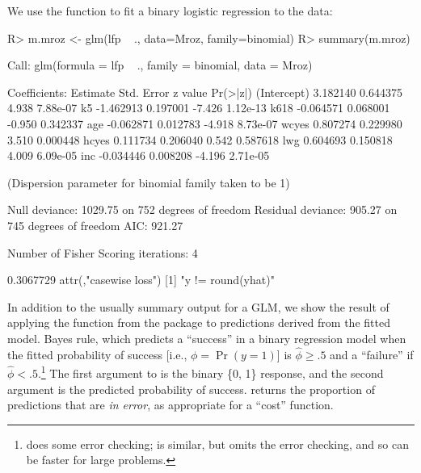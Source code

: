 \documentclass[
]{jss}
\begin{document}
We use the  function to fit a binary logistic regression to
the  data:

\begin{CodeChunk}
\begin{CodeInput}
R> m.mroz <- glm(lfp ~ ., data=Mroz, family=binomial)
R> summary(m.mroz)
\end{CodeInput}
\begin{CodeOutput}

Call:
glm(formula = lfp ~ ., family = binomial, data = Mroz)

Coefficients:
             Estimate Std. Error z value Pr(>|z|)
(Intercept)  3.182140   0.644375   4.938 7.88e-07
k5          -1.462913   0.197001  -7.426 1.12e-13
k618        -0.064571   0.068001  -0.950 0.342337
age         -0.062871   0.012783  -4.918 8.73e-07
wcyes        0.807274   0.229980   3.510 0.000448
hcyes        0.111734   0.206040   0.542 0.587618
lwg          0.604693   0.150818   4.009 6.09e-05
inc         -0.034446   0.008208  -4.196 2.71e-05

(Dispersion parameter for binomial family taken to be 1)

    Null deviance: 1029.75  on 752  degrees of freedom
Residual deviance:  905.27  on 745  degrees of freedom
AIC: 921.27

Number of Fisher Scoring iterations: 4
\end{CodeOutput}
\begin{CodeOutput}
[1] 0.3067729
attr(,"casewise loss")
[1] "y != round(yhat)"
\end{CodeOutput}
\end{CodeChunk}

In addition to the usually summary output for a GLM, we show the result
of applying the  function from the  package to
predictions derived from the fitted model. Bayes rule, which predicts a
``success'' in a binary regression model when the fitted probability of
success {[}i.e., \(\phi = \Pr(y = 1)\){]} is \(\widehat{\phi} \ge .5\)
and a ``failure'' if \(\widehat{\phi} < .5\).\footnote{
  does some error checking;  is similar, but omits
  the error checking, and so can be faster for large problems.} The
first argument to  is the binary \{0, 1\} response,
and the second argument is the predicted probability of success.
 returns the proportion of predictions that are
\emph{in error}, as appropriate for a ``cost'' function.
\end{document}
